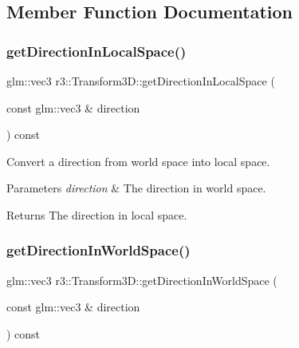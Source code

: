 \subsection{Member Function Documentation}
\mbox{\label{classr3_1_1_transform3_d_ac942055c92499597d01b309b4068917e}} 
\subsubsection{\texorpdfstring{get\+Direction\+In\+Local\+Space()}{getDirectionInLocalSpace()}}
{\footnotesize\ttfamily glm\+::vec3 r3\+::\+Transform3\+D\+::get\+Direction\+In\+Local\+Space (\begin{DoxyParamCaption}\item[{const glm\+::vec3 \&}]{direction }\end{DoxyParamCaption}) const}



Convert a direction from world space into local space. 


\begin{DoxyParams}{Parameters}
{\em direction} & The direction in world space. \\
\hline
\end{DoxyParams}
\begin{DoxyReturn}{Returns}
The direction in local space. 
\end{DoxyReturn}
\mbox{\label{classr3_1_1_transform3_d_a16c5747e86d579935b808a15f4804b2f}} 
\subsubsection{\texorpdfstring{get\+Direction\+In\+World\+Space()}{getDirectionInWorldSpace()}}
{\footnotesize\ttfamily glm\+::vec3 r3\+::\+Transform3\+D\+::get\+Direction\+In\+World\+Space (\begin{DoxyParamCaption}\item[{const glm\+::vec3 \&}]{direction }\end{DoxyParamCaption}) const}



